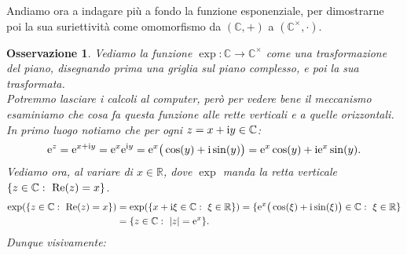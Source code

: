 \documentclass[11pt]{book}
\theoremstyle{Definizione}
\theoremstyle{TeoremaProposizioneLemmaCorollarioCongettura}
\theoremstyle{OsservazioneNotaEsempio}
\newtheorem{myobs}{Osservazione}[section]
\newcommand{\R}{\mathbb{R}}
\newcommand{\C}{\mathbb{C}}
\renewcommand{\Re}{\textup{Re}}
\renewcommand{\i}{\textup{i}}
\newcommand{\e}{\textup{e}}
\begin{document}
Andiamo ora a indagare più a fondo la funzione esponenziale, per dimostrarne poi la sua suriettività come omomorfismo da $(\C,+)$ a $(\C^\times,\cdot)$.
\begin{myobs}
Vediamo la funzione $\exp:\C \longrightarrow \C^\times$ come una trasformazione del piano, disegnando prima una griglia sul piano complesso, e poi la sua trasformata.\\
Potremmo lasciare i calcoli al computer, però per vedere bene il meccanismo esaminiamo che cosa fa questa funzione alle rette verticali e a quelle orizzontali. In primo luogo notiamo che per ogni $z = x+\i y\in \C$:
$$
\e^z = \e^{x+\i y} = \e^x\e^{\i y} = \e^x\big(\cos(y)+\i\sin(y)\big) = \e^x\cos(y)+\i\e^x\sin(y).
$$
Vediamo ora, al variare di $x\in \R$, dove $\exp$ manda la retta verticale $\{z\in \C:\ \Re(z) = x\}$. 
\begin{align*}
\exp(\{z\in \C:\ \Re(z) = x\}) &= \exp(\{x+\i\xi\in \C:\ \xi\in \R\}) = \{\e^x\big(\cos(\xi)+\i\sin(\xi)\big)\in \C:\ \xi\in \R\}\\
&= \{z\in \C:\ |z| = \e^x\}.
\end{align*}
Dunque visivamente:
\begin{center}
\end{center}
\end{myobs}
\end{document}
